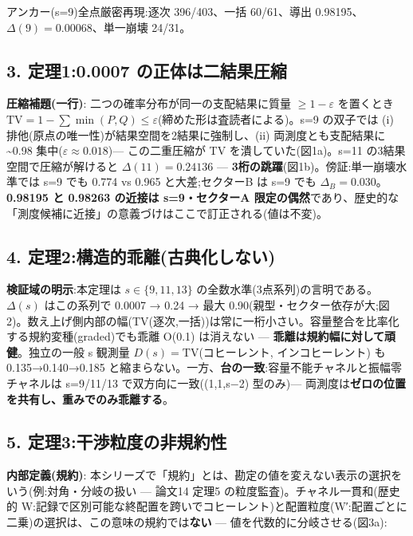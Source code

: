 \documentclass[
]{ltjsarticle}
\begin{document}
アンカー(s=9)全点厳密再現:逐次 396/403、一括 60/61、導出
0.98195、\(\Delta(9)=0.00068\)、単一崩壊 24/31。

\subsection{3. 定理1:0.0007
の正体は二結果圧縮}\label{ux5b9aux740610.0007-ux306eux6b63ux4f53ux306fux4e8cux7d50ux679cux5727ux7e2e}

\textbf{圧縮補題(一行)}: 二つの確率分布が同一の支配結果に質量
\(\ge1-\varepsilon\) を置くとき
\(\mathrm{TV}=1-\sum\min(P,Q)\le\varepsilon\)(締めた形は査読者による)。s=9
の双子では (i) 排他(原点の唯一性)が結果空間を2結果に強制し、(ii)
両測度とも支配結果に \textasciitilde0.98
集中(\(\varepsilon\approx0.018\))--- この二重圧縮が TV
を潰していた(図1a)。s=11 の3結果空間で圧縮が解けると
\(\Delta(11)=0.24136\) ---
\textbf{3桁の跳躍}(図1b)。傍証:単一崩壊水準では s=9 でも 0.774 vs 0.965
と大差;セクターB は s=9 でも \(\Delta_B=0.030\)。\textbf{0.98195 と
0.98263 の近接は s=9・セクターA
限定の偶然}であり、歴史的な「測度候補に近接」の意義づけはここで訂正される(値は不変)。

\subsection{4.
定理2:構造的乖離(古典化しない)}\label{ux5b9aux74062ux69cbux9020ux7684ux4e56ux96e2ux53e4ux5178ux5316ux3057ux306aux3044}

\textbf{検証域の明示}:本定理は \(s\in\{9,11,13\}\)
の全数水準(3点系列)の言明である。\(\Delta(s)\) はこの系列で 0.0007 →
0.24 → 最大
0.90(親型・セクター依存が大;図2)。数え上げ側内部の幅(TV(逐次,一括))は常に一桁小さい。容量整合を比率化する規約変種(graded)でも乖離
O(0.1) は消えない --- \textbf{乖離は規約幅に対して頑健}。独立の一般 s
観測量 \(D(s)=\mathrm{TV}\)(コヒーレント, インコヒーレント) も
0.135→0.140→0.185
と縮まらない。一方、\textbf{台の一致}:容量不能チャネルと振幅零チャネルは
s=9/11/13 で双方向に一致((1,1,s−2) 型のみ)---
両測度は\textbf{ゼロの位置を共有し、重みでのみ乖離する}。

\subsection{5.
定理3:干渉粒度の非規約性}\label{ux5b9aux74063ux5e72ux6e09ux7c92ux5ea6ux306eux975eux898fux7d04ux6027}

\textbf{内部定義(規約)}:
本シリーズで「規約」とは、勘定の値を変えない表示の選択をいう(例:対角・分岐の扱い
--- 論文14 定理5 の粒度監査)。チャネル一貫和(歴史的
W:記録で区別可能な終配置を跨いでコヒーレント)と配置粒度(W′:配置ごとに二乗)の選択は、この意味の規約では\textbf{ない}
--- 値を代数的に分岐させる(図3a):
\end{document}
